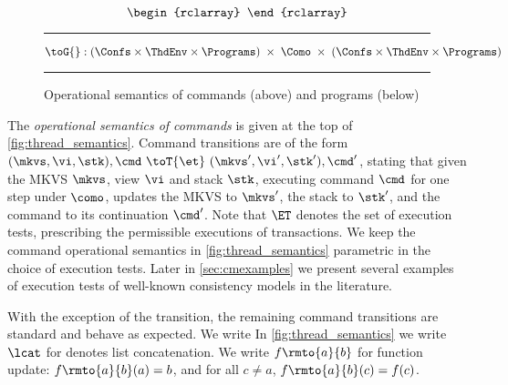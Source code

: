 \begin{figure}[!t]
\[\begin{rclarray}
\end{rclarray}
\]
\vspace{5pt}
\hrule%
\[
	\toG{} : 
    ( \Confs \times \ThdEnv \times \Programs) 
    \;\times\; \Como \;\times\;
    ( \Confs \times \ThdEnv \times \Programs) 
\]
\begin{mathpar}
\end{mathpar}
%
\hrule
\caption{Operational semantics of commands (above) and programs (below)}
\label{def:thread_semantics}
\label{fig:thread_semantics}
\label{def:thread_pool_semantics}
\label{fig:thread_pool_semantics}
\label{def:program_semantics}
\label{fig:program_semantics}
\end{figure}


The \emph{operational semantics of commands} is given at the top of \cref{fig:thread_semantics}. 
Command transitions are of the form $(\mkvs, \vi, \stk), \cmd \ \toT{\et} \ (\mkvs', \vi', \stk') , \cmd'$, stating that given the MKVS $\mkvs$, view $\vi$ and stack $\stk$, executing command $\cmd$ for one step under $\como$, updates the MKVS to $\mkvs'$, the stack to $\stk'$, and the command to its continuation $\cmd'$. 
Note that $\ET$ denotes the set of execution tests, prescribing the permissible executions of transactions. 
We keep the command operational semantics in \cref{fig:thread_semantics} parametric in the choice of execution tests. 
Later in \cref{sec:cmexamples} we present several examples of execution tests of well-known consistency models in the literature. 

With the exception of the  transition, the remaining command transitions are standard and behave as expected. We write 
In \cref{fig:thread_semantics} we write $\lcat$ for denotes list concatenation.
We write $f \rmto{a}{b}$ for function update: $f \rmto{a}{b}(a) = b$, and for all $c \ne a$, $f \rmto{a}{b}(c) = f(c)$.

